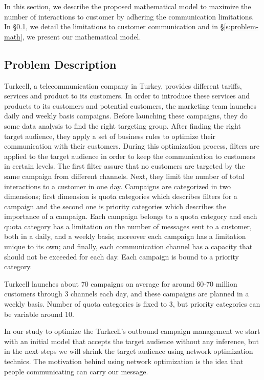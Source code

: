\documentclass[11pt]{article}
\begin{document}
In this section, we describe the proposed mathematical model to maximize the number of interactions to customer by adhering the communication limitations. In \S \ref{s:problem-desc}, we detail the limitations to customer communication and in \S \ref{s:problem-math}, we present our mathematical model.

\subsection{Problem Description} \label{s:problem-desc}

Turkcell, a telecommunication company in Turkey, provides different tariffs, services and product to its customers. In order to introduce these services and products to its customers and potential customers, the marketing team launches daily and weekly basis campaigns. Before launching these campaigns, they do some data analysis to find the right targeting group. After finding the right target audience, they apply a set of business rules to optimize their communication with their customers. During this optimization process, filters are applied to the target audience in order to keep the communication to customers in certain levels. The first filter assure that no customers are targeted by the same campaign from different channels. Next, they limit the number of total interactions to a customer in one day. Campaigns are categorized in two dimensions; first dimension is quota categories which describes filters for a campaign and the second one is priority categories which describes the importance of a campaign. Each campaign belongs to a quota category and each quota category has a limitation on the number of messages sent to a customer, both in a daily, and a weekly basis; moreover each campaign has a limitation unique to its own; and finally, each communication channel has a capacity that should not be exceeded for each day. Each campaign is bound to a priority category.

Turkcell launches about 70 campaigns on average for around 60-70 million customers through 3 channels each day, and these campaigns are planned in a weekly basis. Number of quota categories is fixed to 3, but priority categories can be variable around 10. 

In our study to optimize the Turkcell’s outbound campaign management we start with an initial model that accepts the target audience without any inference, but in the next steps we will shrink the target audience using network optimization technics. The motivation behind using network optimization is the idea that people communicating can carry our message. 
\end{document}
